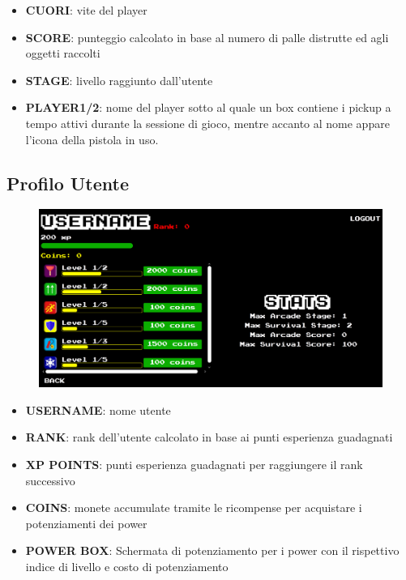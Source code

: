 \documentclass[a4paper,12pt]{report}
\begin{document}
\begin{itemize}
\item \textbf{CUORI}:     vite del player
\item \textbf{SCORE}:     punteggio calcolato in base al numero di palle distrutte ed agli
             oggetti raccolti
\item \textbf{STAGE}:     livello raggiunto dall'utente
\item \textbf{PLAYER1/2}: nome del player sotto al quale un box contiene i pickup a tempo attivi durante la   
             sessione di gioco, mentre accanto al nome appare l'icona della pistola in uso.
\end{itemize}

\subsection*{Profilo Utente}
\begin{figure}[H]
\includegraphics[width=\linewidth]{img/8}
\label{img:decorator}
\end{figure}

\begin{itemize}
\item \textbf{USERNAME}:     nome utente
\item \textbf{RANK}:     rank dell'utente calcolato in base ai punti esperienza guadagnati
\item \textbf{XP POINTS}:     punti esperienza guadagnati per raggiungere il rank successivo
\item \textbf{COINS}: 	monete accumulate tramite le ricompense per acquistare i potenziamenti dei power
\item \textbf{POWER BOX}: 	Schermata di potenziamento per i power con il rispettivo indice di livello e costo di potenziamento
\end{itemize}
\end{document}
